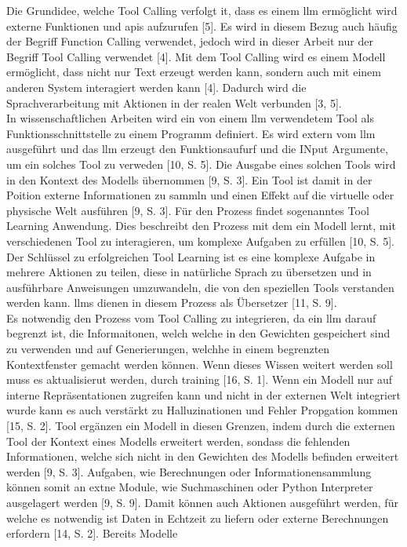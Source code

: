 Die Grundidee, welche Tool Calling verfolgt it, dass es einem \ac{llm} ermöglicht wird externe Funktionen und \ac{api}s aufzurufen [5]. Es wird in diesem Bezug auch
häufig der Begriff Function Calling verwendet, jedoch wird in dieser Arbeit nur der Begriff Tool Calling verwendet [4]. Mit dem Tool Calling wird es einem Modell 
ermöglicht, dass nicht nur Text erzeugt werden kann, sondern auch mit einem anderen System interagiert werden kann [4]. Dadurch wird die Sprachverarbeitung mit 
Aktionen in der realen Welt verbunden [3, 5]. \\
In wissenschaftlichen Arbeiten wird ein von einem \ac{llm} verwendetem Tool als Funktionsschnittstelle zu einem Programm definiert. Es wird extern vom \ac{llm}
ausgeführt und das \ac{llm} erzeugt den Funktionsaufurf und die INput Argumente, um ein solches Tool zu verweden [10, S. 5]. Die Ausgabe eines solchen Tools
wird in den Kontext des Modells übernommen [9, S. 3]. Ein Tool ist damit in der Poition externe Informationen zu sammln und einen Effekt auf die virtuelle oder physische 
Welt ausführen [9, S. 3]. Für den Prozess findet sogenanntes Tool Learning Anwendung. Dies beschreibt den Prozess mit dem ein Modell lernt, mit verschiedenen 
Tool zu interagieren, um komplexe Aufgaben zu erfüllen [10, S. 5]. Der Schlüssel zu erfolgreichen Tool Learning ist es eine komplexe Aufgabe in mehrere
Aktionen zu teilen, diese in natürliche Sprach zu übersetzen und in ausführbare Anweisungen umzuwandeln, die von den speziellen Tools verstanden werden kann. 
\ac{llm}s dienen in diesem Prozess als Übersetzer  [11, S. 9]. \\
Es notwendig den Prozess vom Tool Calling zu integrieren, da ein \ac{llm} darauf begrenzt ist, die Informaitonen, welch welche in den Gewichten gespeichert sind zu 
verwenden und auf Generierungen, welchhe in einem begrenzten Kontextfenster gemacht werden können. Wenn dieses Wissen weitert werden soll muss es aktualisierut werden, 
durch training  [16, S. 1]. Wenn ein Modell nur auf interne Repräsentationen zugreifen kann und nicht in der externen Welt integriert wurde kann es auch verstärkt 
zu Halluzinationen und Fehler Propgation kommen [15, S. 2]. Tool ergänzen ein Modell in diesen Grenzen, indem durch die externen Tool der Kontext eines Modells 
erweitert werden, sondass die fehlenden Informationen, welche sich nicht in den Gewichten des Modells befinden erweitert werden [9, S. 3].
Aufgaben, wie Berechnungen oder Informationensammlung können somit an extne Module, wie Suchmaschinen oder Python Interpreter ausgelagert werden [9, S. 9].
Damit können auch Aktionen ausgeführt werden, für welche es notwendig ist Daten in Echtzeit zu liefern oder externe Berechnungen erfordern [14, S. 2]. Bereits Modelle
